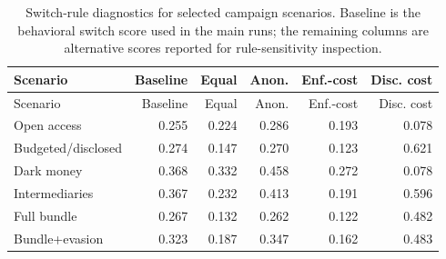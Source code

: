\begingroup
\scriptsize
\setlength{\tabcolsep}{1pt}
\begin{longtable}{lrrrrr}
\caption{Switch-rule diagnostics for selected campaign scenarios. Baseline is the behavioral switch score used in the main runs; the remaining columns are alternative scores reported for rule-sensitivity inspection.}\label{tab:switch-rule-diagnostics}\\
\toprule
Scenario & Baseline & Equal & Anon. & Enf.-cost & Disc. cost \\
\midrule
\endfirsthead
\toprule
Scenario & Baseline & Equal & Anon. & Enf.-cost & Disc. cost \\
\midrule
\endhead
Open access & 0.255 & 0.224 & 0.286 & 0.193 & 0.078 \\
Budgeted/disclosed & 0.274 & 0.147 & 0.270 & 0.123 & 0.621 \\
Dark money & 0.368 & 0.332 & 0.458 & 0.272 & 0.078 \\
Intermediaries & 0.367 & 0.232 & 0.413 & 0.191 & 0.596 \\
Full bundle & 0.267 & 0.132 & 0.262 & 0.122 & 0.482 \\
Bundle+evasion & 0.323 & 0.187 & 0.347 & 0.162 & 0.483 \\
\bottomrule
\end{longtable}
\endgroup
